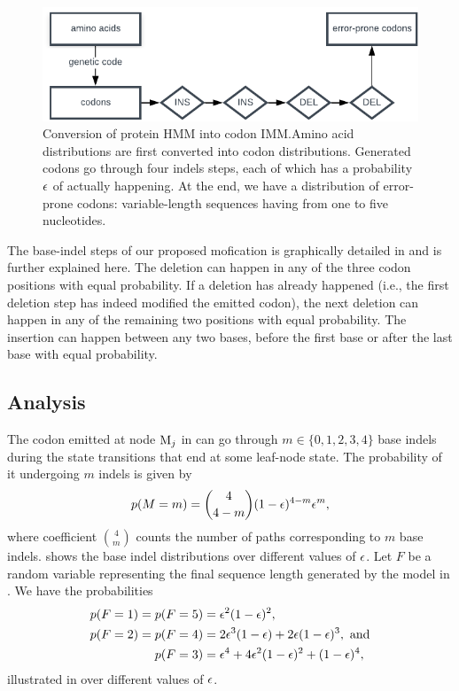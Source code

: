 \begin{figure}[htbp]
  \centering
  \captionsetup{width=.6\linewidth}
  \includegraphics[width=.6\linewidth]{figure/hmm-to-imm}
  \caption{Conversion of protein HMM into codon IMM.\@ Amino acid distributions are first converted
  into codon distributions. Generated codons go through four indels steps, each of which has a
  probability $\epsilon$ of actually happening. At the end, we have a distribution of error-prone
  codons: variable-length sequences having from one to five nucleotides.}\label{fig:hmm-to-imm}
\end{figure}

The base-indel steps of our proposed mofication is graphically detailed in 
and is further explained here. The deletion can happen in any of the three codon positions with
equal probability. If a deletion has already happened (i.e., the first deletion step has indeed
modified the emitted codon), the next deletion can happen in any of the remaining two positions with
equal probability. The insertion can happen between any two bases, before the first base or after
the last base with equal probability.

\subsection{Analysis}

The codon emitted at node $\mathrm{M}_j$ in  can go through $m\in\{0, 1, 2, 3,
4\}$ base indels during the state transitions that end at some leaf-node state. The probability of
it undergoing $m$ indels is given by
\begin{equation*}
  p(M=m) = \binom{4}{4-m} (1 - \epsilon)^{4-m} \epsilon^m,
\end{equation*}
where coefficient $\binom{4}{m}$ counts the number of paths corresponding to $m$ base indels.
 shows the base indel distributions over different values of $\epsilon$.
Let $F$ be a random variable representing the final sequence length generated by the model in
.
We have the probabilities
\begin{equation*}
  \begin{split}
    p(F=1) = p(F=5) &= \epsilon^2(1-\epsilon)^2, \\
    p(F=2) = p(F=4) &= 2\epsilon^3(1-\epsilon) + 2\epsilon(1-\epsilon)^3,~\text{and} \\
    p(F=3)          &= \epsilon^4 + 4\epsilon^2(1-\epsilon)^2 + (1-\epsilon)^4,
  \end{split}
\end{equation*}
illustrated in  over different values of $\epsilon$.


